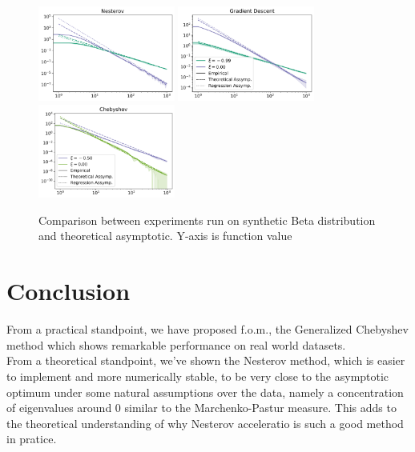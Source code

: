\documentclass{article}
\begin{document}
\begin{figure}[H]
    \centering
    \includegraphics[width= 0.4\textwidth]{new_imgs/nesterov.png}
    \includegraphics[width= 0.4\textwidth]{new_imgs/GD.png}\\
        \includegraphics[width= 0.4\textwidth]{new_imgs/chebyshev.png}

    \caption{Comparison between experiments run on synthetic Beta distribution and theoretical asymptotic. Y-axis is function value }
    \label{fig:my_label}
\end{figure}




\section{Conclusion}
From a practical standpoint, we have proposed f.o.m., the Generalized Chebyshev method which shows remarkable performance on real world datasets. \\
From a theoretical standpoint, we've shown the Nesterov method, which is easier to implement and more numerically stable, to be very close to the asymptotic optimum   under some natural assumptions over the data, namely a concentration of eigenvalues around $0$ similar to the Marchenko-Pastur measure. This adds to the theoretical understanding of why Nesterov acceleratio is such a good method in pratice. 
\end{document}
